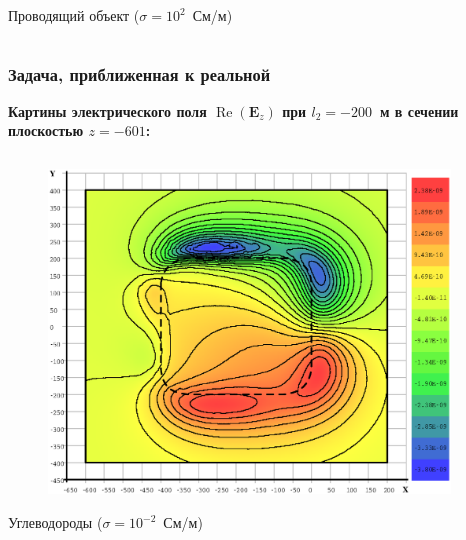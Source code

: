 \documentclass[aspectratio=43]{beamer}
\renewcommand{\Re}{\mathop{\mathrm{Re}}\nolimits}
\newcommand{\MakeTitle}[1]{\frametitle{\hspace{1.5em}\textbf{#1} \hfill \insertframenumber{} }}
\begin{document}
\begin{frame}
\begin{columns}[t,totalwidth=\linewidth]
\begin{column}{.5\linewidth}
\begin{figure}[H]
			\end{figure}
			\begin{center}
				\vspace{-1em}
				\tiny{Проводящий объект ($\sigma = 10^{2}$~См/м)}
			\end{center}
		\end{column}
	\end{columns}
\end{frame}


\begin{frame}
	\MakeTitle{Задача, приближенная к реальной}
	\textbf{Картины электрического поля $\Re(\mathbf{E}_z)$ при $l_2 = -200$~м в сечении плоскостью $z=-601$:}
	\begin{columns}[t,totalwidth=\linewidth]
		\hspace{-0.07\linewidth}
		\begin{column}{.5\linewidth}
			\vspace{-2.75em}
			\begin{figure}[H]
				\includegraphics[width=1.1\textwidth,height=1.1\textheight,keepaspectratio]{200_no_z=-601_EzR.eps}
			\end{figure}
			\begin{center}
				\vspace{-1em}
				\tiny{Углеводороды ($\sigma = 10^{-2}$~См/м)}
			\end{center}
		\end{column}
		\begin{column}{.5\linewidth}

\end{column}
\end{columns}
\end{frame}
\end{document}
